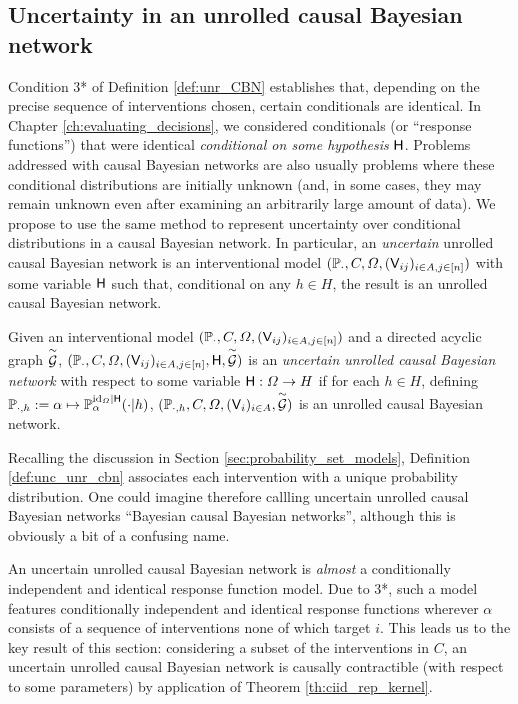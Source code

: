 \subsection{Uncertainty in an unrolled causal Bayesian network}

Condition 3* of Definition \ref{def:unr_CBN} establishes that, depending on the precise sequence of interventions chosen, certain conditionals are identical. In Chapter \ref{ch:evaluating_decisions}, we considered conditionals (or ``response functions'') that were identical \emph{conditional on some hypothesis} $\mathsf{H}$. Problems addressed with causal Bayesian networks are also usually problems where these conditional distributions are initially unknown (and, in some cases, they may remain unknown even after examining an arbitrarily large amount of data). We propose to use the same method to represent uncertainty over conditional distributions in a causal Bayesian network. In particular, an \emph{uncertain} unrolled causal Bayesian network is an interventional model $(\mathbb{P}_\cdot,C,\Omega,(\mathsf{V}_{ij})_{i\in A,j\in [n]})$ with some variable $\mathsf{H}$ such that, conditional on any $h\in H$, the result is an unrolled causal Bayesian network.

\begin{definition}\label{def:unc_unr_cbn}
Given an interventional model $(\mathbb{P}_\cdot,C,\Omega,(\mathsf{V}_{ij})_{i\in A,j\in [n]})$ and a directed acyclic graph $\overset{\sim}{\mathcal{G}}$, $(\mathbb{P}_\cdot,C,\Omega,(\mathsf{V}_{ij})_{i\in A,j\in [n]},\mathsf{H},\overset{\sim}{\mathcal{G}})$ is an \emph{uncertain unrolled causal Bayesian network} with respect to some variable $\mathsf{H}:\Omega\to H$ if for each $h\in H$, defining $\mathbb{P}_{\cdot,h}:= \alpha\mapsto \mathbb{P}_\alpha^{\mathrm{id}_{\Omega}|\mathsf{H}}(\cdot|h)$, $(\mathbb{P}_{\cdot,h},C,\Omega,(\mathsf{V}_i)_{i\in A},\overset{\sim}{\mathcal{G}})$ is an unrolled causal Bayesian network.
\end{definition}

Recalling the discussion in Section \ref{sec:probability_set_models}, Definition \ref{def:unc_unr_cbn} associates each intervention with a unique probability distribution. One could imagine therefore callling uncertain unrolled causal Bayesian networks ``Bayesian causal Bayesian networks'', although this is obviously a bit of a confusing name.

An uncertain unrolled causal Bayesian network is \emph{almost} a conditionally independent and identical response function model. Due to 3*, such a model features conditionally independent and identical response functions wherever $\alpha$ consists of a sequence of interventions none of which target $i$. This leads us to the key result of this section: considering a subset of the interventions in $C$, an uncertain unrolled causal Bayesian network is causally contractible (with respect to some parameters) by application of Theorem \ref{th:ciid_rep_kernel}.


